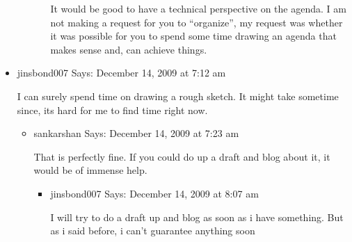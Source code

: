 \begin{english}
\begin{itemize}
\begin{itemize}
\begin{itemize}
        It would be good to have a technical perspective on the agenda. I am not making a request for you to “organize”, my request was whether it was possible for you to spend some time drawing an agenda that makes sense and, can achieve things.
	\end{itemize}
    \end{itemize}

\item jinsbond007 Says:
December 14, 2009 at 7:12 am

I can surely spend time on drawing a rough sketch.
It might take sometime since, its hard for me to find time right now.

    \begin{itemize}
    \item sankarshan Says:
    December 14, 2009 at 7:23 am

    That is perfectly fine. If you could do up a draft and blog about it, it would be of immense help.
	\begin{itemize}
        \item jinsbond007 Says:
        December 14, 2009 at 8:07 am

        I will try to do a draft up and blog as soon as i have something. But as i said before, i can’t guarantee anything soon
	\end{itemize}
    \end{itemize}
\end{itemize}

\end{english}
